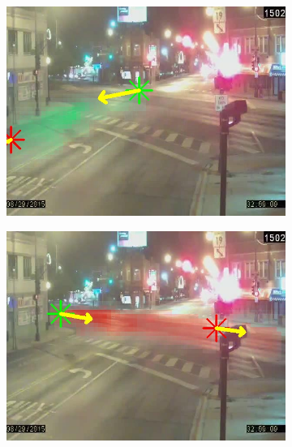 \begin{figure}
    \centering
        \begin{subfigure}{0.32\linewidth}
            \includegraphics[width=\linewidth]{./img/scene_learning/res/elstonIrvingPark/20150829_020000DST_elstonIrvingPark-0.jpg}
        \end{subfigure}
        \begin{subfigure}{0.32\linewidth}
            \includegraphics[width=\linewidth]{./img/scene_learning/res/elstonIrvingPark/20150829_020000DST_elstonIrvingPark-1.jpg}
        \end{subfigure}


\end{figure}
